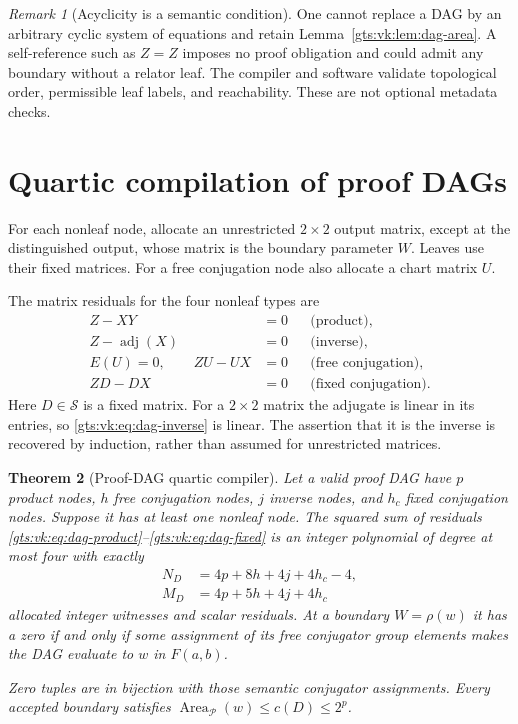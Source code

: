 \documentclass[11pt,letterpaper]{article}
\newtheorem{theorem}{Theorem}[section]
\theoremstyle{definition}
\theoremstyle{remark}
\newtheorem{remark}[theorem]{Remark}
\newcommand{\Pp}{\mathcal P}
\newcommand{\F}{F(a,b)}
\newcommand{\San}{\mathcal S}
\newcommand{\Area}{\operatorname{Area}}
\newcommand{\adj}{\operatorname{adj}}
\begin{document}
\begin{remark}[Acyclicity is a semantic condition]
One cannot replace a DAG by an arbitrary cyclic system of equations and retain Lemma~\ref{gts:vk:lem:dag-area}. A self-reference such as $Z=Z$ imposes no proof obligation and could admit any boundary without a relator leaf. The compiler and software validate topological order, permissible leaf labels, and reachability. These are not optional metadata checks.
\end{remark}

\section{Quartic compilation of proof DAGs}\label{gts:vk:sec:dag-compiler}

For each nonleaf node, allocate an unrestricted $2\times2$ output matrix, except at the distinguished output, whose matrix is the boundary parameter $W$. Leaves use their fixed matrices. For a free conjugation node also allocate a chart matrix $U$.

The matrix residuals for the four nonleaf types are
\begin{align}
 Z-XY&=0 &&\text{(product)},\label{gts:vk:eq:dag-product}\\
 Z-\adj(X)&=0 &&\text{(inverse)},\label{gts:vk:eq:dag-inverse}\\
 E(U)=0,\qquad ZU-UX&=0 &&\text{(free conjugation)},\label{gts:vk:eq:dag-conj}\\
 ZD-DX&=0 &&\text{(fixed conjugation)}.\label{gts:vk:eq:dag-fixed}
\end{align}
Here $D\in\San$ is a fixed matrix. For a $2\times2$ matrix the adjugate is linear in its entries, so \eqref{gts:vk:eq:dag-inverse} is linear. The assertion that it is the inverse is recovered by induction, rather than assumed for unrestricted matrices.

\begin{theorem}[Proof-DAG quartic compiler]\label{gts:vk:thm:dag-compiler}
Let a valid proof DAG have $p$ product nodes, $h$ free conjugation nodes, $j$ inverse nodes, and $h_c$ fixed conjugation nodes. Suppose it has at least one nonleaf node. The squared sum of residuals \eqref{gts:vk:eq:dag-product}--\eqref{gts:vk:eq:dag-fixed} is an integer polynomial of degree at most four with exactly
\begin{align}
 N_D&=4p+8h+4j+4h_c-4,\label{gts:vk:eq:dag-vars}\\
 M_D&=4p+5h+4j+4h_c\label{gts:vk:eq:dag-residuals}
\end{align}
allocated integer witnesses and scalar residuals. At a boundary $W=\rho(w)$ it has a zero if and only if some assignment of its free conjugator group elements makes the DAG evaluate to $w$ in $\F$.

Zero tuples are in bijection with those semantic conjugator assignments. Every accepted boundary satisfies $\Area_{\Pp}(w)\leq c(D)\leq2^p$.
\end{theorem}
\end{document}
